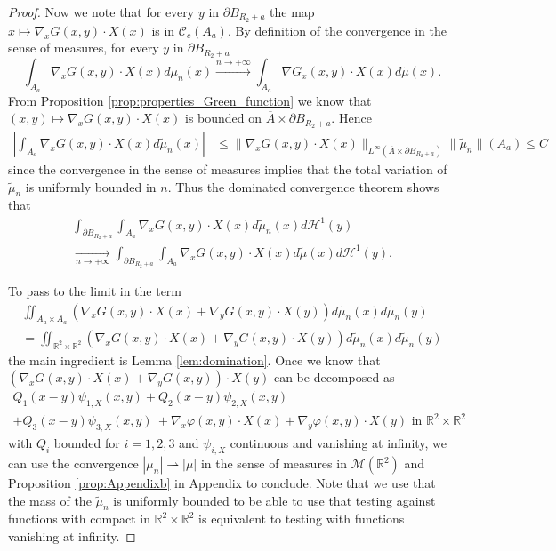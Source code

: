 \documentclass[12pt,reqno]{amsart}
\def\C{{\mathcal C}}
\def \p {\partial}
\newcommand{\R}{\mathbb{R}}
\numberwithin{equation}{section}
\begin{document}
\begin{proof}
Now we note that for every \(y\) in \(\p B_{R_2+a}\) the map \(x \mapsto \nabla_x G(x,y)\cdot X(x)\) is in \(\C_c(A_a)\). By definition of the convergence in the sense of measures, for every \(y\) in \(\p B_{R_2+a}\)
\[ \int_{A_a}\nabla_xG(x,y)\cdot X(x) d\tilde{\mu}_n (x) \xrightarrow[]{n \to +\infty} \int_{A_a}\nabla G_x(x,y) \cdot X(x) d \tilde{\mu}(x). \]
From Proposition \ref{prop:properties_Green_function} we know that \( (x,y) \mapsto \nabla_xG(x,y)\cdot X(x)\) is bounded on \(\overline{A}\times \p B_{R_2+a}\). Hence
\begin{align*}
\left| \int_{A_a} \nabla_x G(x,y)\cdot X(x) d \tilde{\mu}_n(x) \right| &\leq \| \nabla_xG(x,y)\cdot X(x)\|_{L^\infty(\overline{A}\times \p B_{R_2+a}) } \|\tilde{\mu}_n\|(A_a) \leq C
\end{align*}
since the convergence in the sense of measures implies that the total variation of \( \tilde{\mu}_n\) is uniformly bounded in \(n\). Thus the dominated convergence theorem shows that
\begin{multline*}
 \int_{\p B_{R_2+a}} \int_{A_a} \nabla_x G(x,y)\cdot X(x) d\tilde{\mu}_n(x) d\mathcal{H}^1(y) \\
 \xrightarrow[n \to +\infty]{}   \int_{\p B_{R_2+a}} \int_{A_a} \nabla_x G(x,y)\cdot X(x) d\tilde{\mu}(x) d\mathcal{H}^1(y).
\end{multline*}

To pass to the limit in the term
\begin{multline*}
\iint_{A_a\times A_a} \left(\nabla_x G(x,y)\cdot X(x) + \nabla_y G(x,y)  \cdot X(y) \right)d\tilde{\mu}_n(x)d\tilde{\mu}_n(y)\\
=\iint_{\R^2 \times \R^2} \left(\nabla_x G(x,y)\cdot X(x) + \nabla_y G(x,y)  \cdot X(y) \right)d\tilde{\mu}_n(x)d\tilde{\mu}_n(y)
\end{multline*}
 the main ingredient is Lemma \ref{lem:domination}.  Once we know that \(\left(\nabla_x G(x,y)\cdot X(x) + \nabla_y G(x,y) \right) \cdot X(y)\) can be decomposed as 
\begin{multline*}
Q_1(x-y)\psi_{1,X}(x,y)+ Q_2(x-y)\psi_{2,X}(x,y)\\+ Q_3(x-y)\psi_{3,X}(x,y)\
+\nabla _x \varphi(x,y)\cdot X(x) + \nabla _y \varphi(x,y)\cdot X(y) \text{ in } \R^2\times \R^2
\end{multline*}
 with \(Q_i\) bounded for \(i=1,2,3\) and \(\psi_{i,X}\) continuous and vanishing at infinity, we can use the convergence \(|\mu_n| \rightharpoonup |\mu|\) in the sense of measures in \(\mathcal{M}(\R^2)\) and Proposition \ref{prop:Appendixb} in Appendix to conclude. Note that we use that the mass of the \(\tilde{\mu}_n\) is uniformly bounded to be able to use that testing against functions with compact in \(\R^2\times \R^2\) is equivalent to testing with functions vanishing at infinity.
\end{proof}
\end{document}
